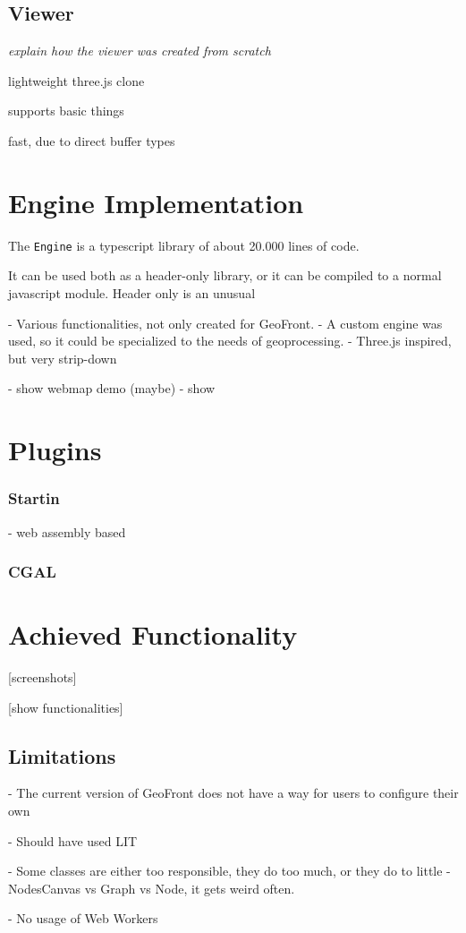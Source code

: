 \subsection{Viewer}
\emph{explain how the viewer was created from scratch}

lightweight three.js clone

supports basic things

fast, due to direct buffer types








\section{Engine Implementation}
The \verb|Engine| is a typescript library of about 20.000 lines of code. 

It can be used both as a header-only library, or it can be compiled to a normal javascript module. 
Header only is an unusual 

- Various functionalities, not only created for GeoFront.
- A custom engine was used, so it could be specialized to the needs of geoprocessing. 
- Three.js inspired, but very strip-down

- show webmap demo (maybe)
- show 


\section{ Plugins }


\subsubsection{ Startin }
- web assembly based

\subsubsection{ CGAL }


\section{Achieved Functionality}

[screenshots]

[show functionalities]


\subsection{Limitations}
- The current version of GeoFront does not have a way for users to configure their own

- Should have used LIT

- Some classes are either too responsible, they do too much, or they do to little
  - NodesCanvas vs Graph vs Node, it gets weird often.

- No usage of Web Workers